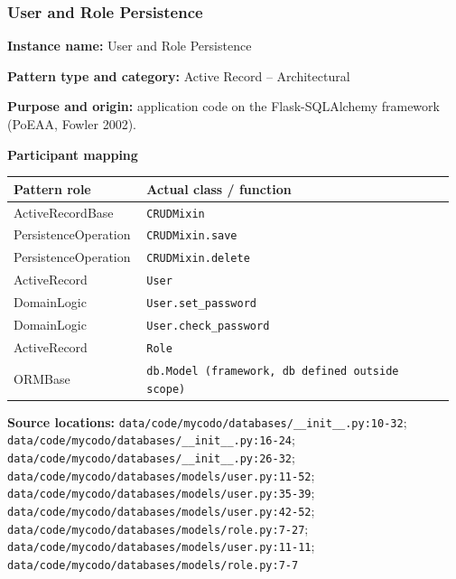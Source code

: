 \documentclass[11pt,a4paper]{article}
\newcommand{\field}[2]{\textbf{#1:} #2\par}
\begin{document}
\subsubsection{User and Role Persistence}
\field{Instance name}{User and Role Persistence}
\field{Pattern type and category}{Active Record -- Architectural}
\field{Purpose and origin}{application code on the Flask-SQLAlchemy framework (PoEAA, Fowler 2002).}
\textbf{Participant mapping}\par
{\small\setlength{\tabcolsep}{3pt}
\begin{longtable}{@{}P{0.29\linewidth}P{0.68\linewidth}@{}}\toprule
\textbf{Pattern role} & \textbf{Actual class / function} \\ \midrule\endhead
ActiveRecordBase & \texttt{CRUDMixin} \\
PersistenceOperation & \texttt{CRUDMixin.\allowbreak{}save} \\
PersistenceOperation & \texttt{CRUDMixin.\allowbreak{}delete} \\
ActiveRecord & \texttt{User} \\
DomainLogic & \texttt{User.\allowbreak{}set\_\allowbreak{}password} \\
DomainLogic & \texttt{User.\allowbreak{}check\_\allowbreak{}password} \\
ActiveRecord & \texttt{Role} \\
ORMBase & \texttt{db.\allowbreak{}Model (framework, db defined outside scope)} \\
\bottomrule\end{longtable}}
\textbf{Source locations:} \texttt{data/\allowbreak{}code/\allowbreak{}mycodo/\allowbreak{}databases/\allowbreak{}\_\allowbreak{}\_\allowbreak{}init\_\allowbreak{}\_\allowbreak{}.\allowbreak{}py:10-32}; \texttt{data/\allowbreak{}code/\allowbreak{}mycodo/\allowbreak{}databases/\allowbreak{}\_\allowbreak{}\_\allowbreak{}init\_\allowbreak{}\_\allowbreak{}.\allowbreak{}py:16-24}; \texttt{data/\allowbreak{}code/\allowbreak{}mycodo/\allowbreak{}databases/\allowbreak{}\_\allowbreak{}\_\allowbreak{}init\_\allowbreak{}\_\allowbreak{}.\allowbreak{}py:26-32}; \texttt{data/\allowbreak{}code/\allowbreak{}mycodo/\allowbreak{}databases/\allowbreak{}models/\allowbreak{}user.\allowbreak{}py:11-52}; \texttt{data/\allowbreak{}code/\allowbreak{}mycodo/\allowbreak{}databases/\allowbreak{}models/\allowbreak{}user.\allowbreak{}py:35-39}; \texttt{data/\allowbreak{}code/\allowbreak{}mycodo/\allowbreak{}databases/\allowbreak{}models/\allowbreak{}user.\allowbreak{}py:42-52}; \texttt{data/\allowbreak{}code/\allowbreak{}mycodo/\allowbreak{}databases/\allowbreak{}models/\allowbreak{}role.\allowbreak{}py:7-27}; \texttt{data/\allowbreak{}code/\allowbreak{}mycodo/\allowbreak{}databases/\allowbreak{}models/\allowbreak{}user.\allowbreak{}py:11-11}; \texttt{data/\allowbreak{}code/\allowbreak{}mycodo/\allowbreak{}databases/\allowbreak{}models/\allowbreak{}role.\allowbreak{}py:7-7}\par
\end{document}
